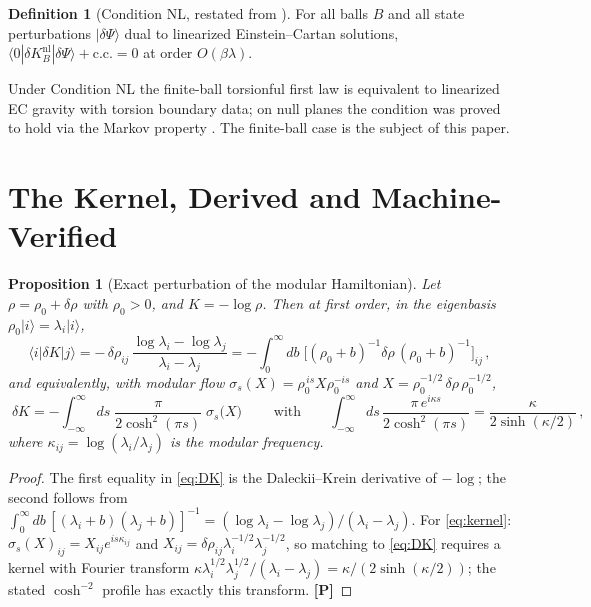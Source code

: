 \documentclass[11pt]{article}
\newtheorem{proposition}[theorem]{Proposition}
\theoremstyle{definition}
\newtheorem{definition}[theorem]{Definition}
\newcommand{\pP}{\textbf{[P]}}
\begin{document}
\begin{definition}[Condition NL, restated from \cite{McGwier2026b}]
For all balls $B$ and all state perturbations $|\delta\Psi\rangle$ dual to
linearized Einstein--Cartan solutions,
$\langle0|\delta K_B^{\mathrm{nl}}|\delta\Psi\rangle+\mathrm{c.c.}=0$
at order $O(\beta\lambda)$.
\end{definition}

Under Condition NL the finite-ball torsionful first law is equivalent to
linearized EC gravity with torsion boundary data; on null planes the
condition was proved to hold via the Markov property
\cite{CasiniTesteTorroba2017}. The finite-ball case is the subject of this
paper.

\section{The Kernel, Derived and Machine-Verified}

\begin{proposition}[Exact perturbation of the modular Hamiltonian]
\label{prop:kernel}
Let $\rho=\rho_0+\delta\rho$ with $\rho_0>0$, and $K=-\log\rho$. Then at
first order, in the eigenbasis $\rho_0|i\rangle=\lambda_i|i\rangle$,
\begin{equation}
\langle i|\delta K|j\rangle
=-\,\delta\rho_{ij}\,
\frac{\log\lambda_i-\log\lambda_j}{\lambda_i-\lambda_j}
=-\int_0^\infty\! db\;
\big[(\rho_0+b)^{-1}\delta\rho\,(\rho_0+b)^{-1}\big]_{ij}\,,
\label{eq:DK}
\end{equation}
and equivalently, with modular flow
$\sigma_s(X)=\rho_0^{\,is}X\rho_0^{-is}$ and
$X=\rho_0^{-1/2}\,\delta\rho\,\rho_0^{-1/2}$,
\begin{equation}
\boxed{\;\delta K
=-\int_{-\infty}^{\infty}\! ds\;
\frac{\pi}{2\cosh^2(\pi s)}\;\sigma_s\!\big(X\big)\;}
\qquad\text{with}\qquad
\int_{-\infty}^{\infty}\!ds\,
\frac{\pi\,e^{i\kappa s}}{2\cosh^2(\pi s)}
=\frac{\kappa}{2\sinh(\kappa/2)}\,,
\label{eq:kernel}
\end{equation}
where $\kappa_{ij}=\log(\lambda_i/\lambda_j)$ is the modular frequency.
\end{proposition}

\begin{proof}
The first equality in \eqref{eq:DK} is the Daleckii--Krein derivative of
$-\log$; the second follows from
$\int_0^\infty db\,[(\lambda_i+b)(\lambda_j+b)]^{-1}
=(\log\lambda_i-\log\lambda_j)/(\lambda_i-\lambda_j)$. For
\eqref{eq:kernel}: $\sigma_s(X)_{ij}=X_{ij}e^{is\kappa_{ij}}$ and
$X_{ij}=\delta\rho_{ij}\lambda_i^{-1/2}\lambda_j^{-1/2}$, so matching to
\eqref{eq:DK} requires a kernel with Fourier transform
$\kappa\lambda_i^{1/2}\lambda_j^{1/2}/(\lambda_i-\lambda_j)
=\kappa/(2\sinh(\kappa/2))$; the stated $\cosh^{-2}$ profile has exactly
this transform. \pP{}
\end{proof}
\end{document}
